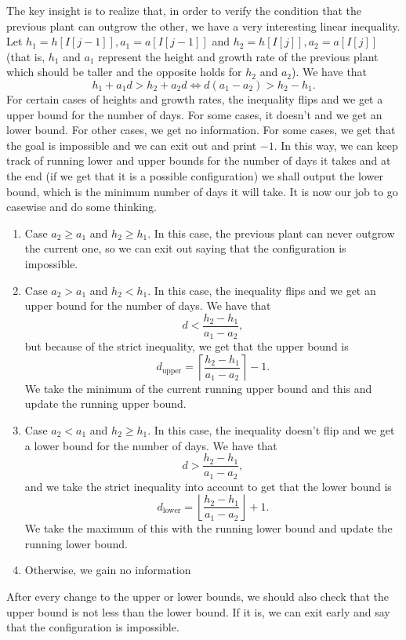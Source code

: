 \documentclass[12pt]{article}
\begin{document}
\begin{problemnum}
    The key insight is to realize that, in order to verify the condition that
    the previous plant can outgrow the other, we have a very interesting linear
    inequality. Let \( h_1 = h[I[j-1]], a_1 = a[I[j-1]] \) and \( h_2 = h[I[j]], a_2 = a[I[j]] \) (that is, \( h_1 \) and \( a_1 \) represent the height and growth rate of the previous plant which should be taller and the opposite holds for \( h_2 \) and \( a_2 \)). We have that
    \[
        h_1 + a_1 d > h_2 + a_2 d \iff d \left( a_1 - a_2 \right) > h_2 - h_1
    .\]
    For certain cases of heights and growth rates, the inequality flips and we
    get a upper bound for the number of days. For some cases, it doesn't and we
    get an lower bound. For other cases, we get no information. For some cases,
    we get that the goal is impossible and we can exit out and print \( -1 \).
    In this way, we can keep track of running lower and upper bounds for the
    number of days it takes and at the end (if we get that it is a possible
    configuration) we shall output the lower bound, which is the minimum number
    of days it will take. It is now our job to go casewise and do some thinking.
    \begin{enumerate}
        \item Case \( a_2 \ge a_1 \) and \( h_2 \ge h_1 \). In this case, the previous plant can never outgrow the current one, so we can exit out saying that the configuration is impossible.
        \item Case \( a_2 > a_1 \) and \( h_2 < h_1 \). In this case, the
            inequality flips and we get an upper bound for the number of days. We have that
            \[
                d < \frac{h_2 - h_1}{a_1 - a_2}
            ,\]
            but because of the strict inequality, we get that the upper bound is
            \[
                d_{\textrm{upper}} = \left\lceil \frac{h_2 - h_1}{a_1 - a_2} \right\rceil - 1
            .\]
            We take the minimum of the current running upper bound and this and
            update the running upper bound.
        \item Case \( a_2 < a_1 \) and \( h_2 \ge h_1 \). In this case, the
            inequality doesn't flip and we get a lower bound for the number of
            days. We have that
            \[
                d > \frac{h_2 - h_1}{a_1 - a_2}
            ,\]
            and we take the strict inequality into account to get that the lower bound is
            \[
                d_{\textrm{lower}} = \left\lfloor \frac{h_2 - h_1}{a_1 - a_2} \right\rfloor + 1
            .\]
            We take the maximum of this with the running lower bound and update the running lower bound.
        \item Otherwise, we gain no information
    \end{enumerate}
    After every change to the upper or lower bounds, we should also check that the upper bound is not less than the lower bound. If it is, we can exit early and say that the configuration is impossible.


\end{problemnum}
\end{document}
